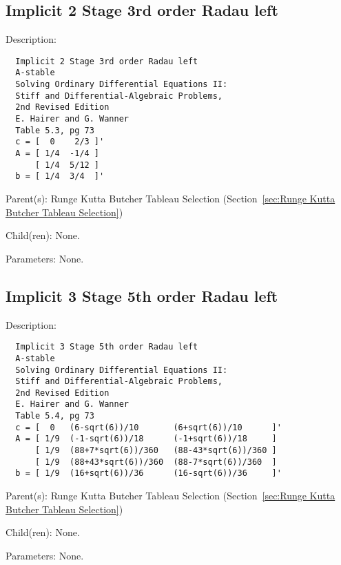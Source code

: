 \subsection{Implicit 2 Stage 3rd order Radau left}
\label{sec:Implicit 2 Stage 3rd order Radau left}

\begin{list}{}
  {\setlength{\leftmargin}{1.0in}
   \setlength{\labelwidth}{0.75in}
   \setlength{\labelsep}{0.125in}}
  \item[Description:]
\begin{verbatim}
  Implicit 2 Stage 3rd order Radau left
  A-stable
  Solving Ordinary Differential Equations II:
  Stiff and Differential-Algebraic Problems,
  2nd Revised Edition
  E. Hairer and G. Wanner
  Table 5.3, pg 73
  c = [  0    2/3 ]'
  A = [ 1/4  -1/4 ]
      [ 1/4  5/12 ]
  b = [ 1/4  3/4  ]'
\end{verbatim}
  \item[Parent(s):]
    Runge Kutta Butcher Tableau Selection (Section~\ref{sec:Runge Kutta Butcher Tableau Selection})
  \item[Child(ren):]
    None. 
  \item[Parameters:]
    None. 
\end{list}

\subsection{Implicit 3 Stage 5th order Radau left}
\label{sec:Implicit 3 Stage 5th order Radau left}

\begin{list}{}
  {\setlength{\leftmargin}{1.0in}
   \setlength{\labelwidth}{0.75in}
   \setlength{\labelsep}{0.125in}}
  \item[Description:]
\begin{verbatim}
  Implicit 3 Stage 5th order Radau left
  A-stable
  Solving Ordinary Differential Equations II:
  Stiff and Differential-Algebraic Problems,
  2nd Revised Edition
  E. Hairer and G. Wanner
  Table 5.4, pg 73
  c = [  0   (6-sqrt(6))/10       (6+sqrt(6))/10      ]'
  A = [ 1/9  (-1-sqrt(6))/18      (-1+sqrt(6))/18     ]
      [ 1/9  (88+7*sqrt(6))/360   (88-43*sqrt(6))/360 ]
      [ 1/9  (88+43*sqrt(6))/360  (88-7*sqrt(6))/360  ]
  b = [ 1/9  (16+sqrt(6))/36      (16-sqrt(6))/36     ]'
\end{verbatim}
  \item[Parent(s):]
    Runge Kutta Butcher Tableau Selection (Section~\ref{sec:Runge Kutta Butcher Tableau Selection})
  \item[Child(ren):]
    None. 
  \item[Parameters:]
    None. 
\end{list}

